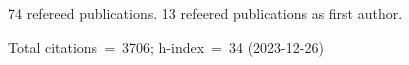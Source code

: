 74 refereed publications. 13 refeered publications as first author.

Total citations~=~3706; h-index~=~34 (2023-12-26)